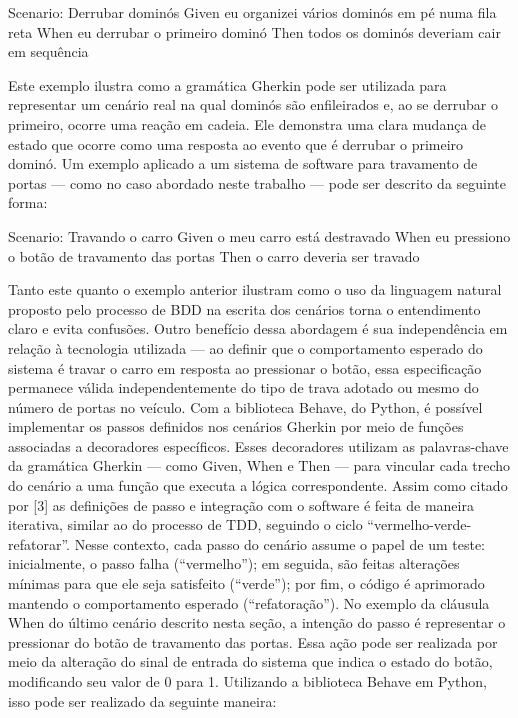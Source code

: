 Scenario: Derrubar dominós
Given eu organizei vários dominós em pé numa fila reta
When eu derrubar o primeiro dominó
Then todos os dominós deveriam cair em sequência 

Este exemplo ilustra como a gramática Gherkin pode ser utilizada para representar um cenário real na qual dominós são enfileirados e, ao se derrubar o primeiro, ocorre uma reação em cadeia. Ele demonstra uma clara mudança de estado que ocorre como uma resposta ao evento que é derrubar o primeiro dominó.
Um exemplo aplicado a um sistema de software para travamento de portas — como no caso abordado neste trabalho — pode ser descrito da seguinte forma:

Scenario: Travando o carro
Given o meu carro está destravado
When eu pressiono o botão de travamento das portas
Then o carro deveria ser travado

Tanto este quanto o exemplo anterior ilustram como o uso da linguagem natural proposto pelo processo de BDD na escrita dos cenários torna o entendimento claro e evita confusões. Outro benefício dessa abordagem é sua independência em relação à tecnologia utilizada — ao definir que o comportamento esperado do sistema é travar o carro em resposta ao pressionar o botão, essa especificação permanece válida independentemente do tipo de trava adotado ou mesmo do número de portas no veículo.
Com a biblioteca Behave, do Python, é possível implementar os passos definidos nos cenários Gherkin por meio de funções associadas a decoradores específicos. Esses decoradores utilizam as palavras-chave da gramática Gherkin — como Given, When e Then — para vincular cada trecho do cenário a uma função que executa a lógica correspondente.
Assim como citado por [3] as definições de passo e integração com o software é feita de maneira iterativa, similar ao do processo de TDD, seguindo o ciclo “vermelho-verde-refatorar”. Nesse contexto, cada passo do cenário assume o papel de um teste: inicialmente, o passo falha (“vermelho”); em seguida, são feitas alterações mínimas para que ele seja satisfeito (“verde”); por fim, o código é aprimorado mantendo o comportamento esperado (“refatoração”).
No exemplo da cláusula When do último cenário descrito nesta seção, a intenção do passo é representar o pressionar do botão de travamento das portas. Essa ação pode ser realizada por meio da alteração do sinal de entrada do sistema que indica o estado do botão, modificando seu valor de 0 para 1. Utilizando a biblioteca Behave em Python, isso pode ser realizado da seguinte maneira:


